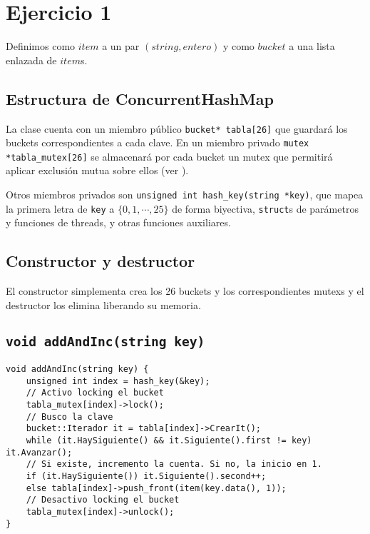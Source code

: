 \section{Ejercicio 1}

Definimos como $item$ a un par $(string, entero)$ y como $bucket$ a una lista enlazada de $item$s.


\subsection{Estructura de ConcurrentHashMap}

La clase cuenta con un miembro público \texttt{bucket* tabla[26]} que guardará los buckets correspondientes a cada clave. En un miembro privado \texttt{mutex *tabla_mutex[26]} se almacenará por cada bucket un mutex que permitirá aplicar exclusión mutua sobre ellos (ver \cite{cppref-mutex}).

Otros miembros privados son \texttt{unsigned int hash_key(string *key)}, que mapea la primera letra de \texttt{key} a $\{ 0, 1, \cdots, 25 \}$ de forma biyectiva, \texttt{struct}s de parámetros y funciones de threads, y otras funciones auxiliares.


\subsection{Constructor y destructor}

El constructor simplementa crea los 26 buckets y los correspondientes mutexs y el destructor los elimina liberando su memoria.


\subsection{\texttt{void addAndInc(string key)}}

\begin{verbatim}
void addAndInc(string key) {
	unsigned int index = hash_key(&key);
	// Activo locking el bucket
	tabla_mutex[index]->lock();
	// Busco la clave
	bucket::Iterador it = tabla[index]->CrearIt();
	while (it.HaySiguiente() && it.Siguiente().first != key) it.Avanzar();
	// Si existe, incremento la cuenta. Si no, la inicio en 1.
	if (it.HaySiguiente()) it.Siguiente().second++;
	else tabla[index]->push_front(item(key.data(), 1));
	// Desactivo locking el bucket
	tabla_mutex[index]->unlock();
}
\end{verbatim}

